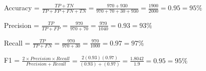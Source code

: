 \documentclass[12pt, letterpaper]{article}
\begin{document}
Accuracy = $\frac{TP + TN}{TP + FP + FN + TN} = \frac{970+930}{970+70+30+930} = \frac{1900}{2000} = 0.95 = 95\%$

Precision = $\frac{TP}{TP + FP} = \frac{970}{970 + 70} = \frac{970}{1040} = 0.93 = 93\%$

Recall = $\frac{TP}{TP + FN} = \frac{970}{970+30} = \frac{970}{1000} = 0.97 = 97\%$

F1 = $\frac{2 \times Precision \times Recall}{Precision + Recall} = \frac{2 (0.93)(0.97)}{(0.93)+(0.97)} = \frac{1.8042}{1.9} = 0.95 = 95\%$
\end{document}
